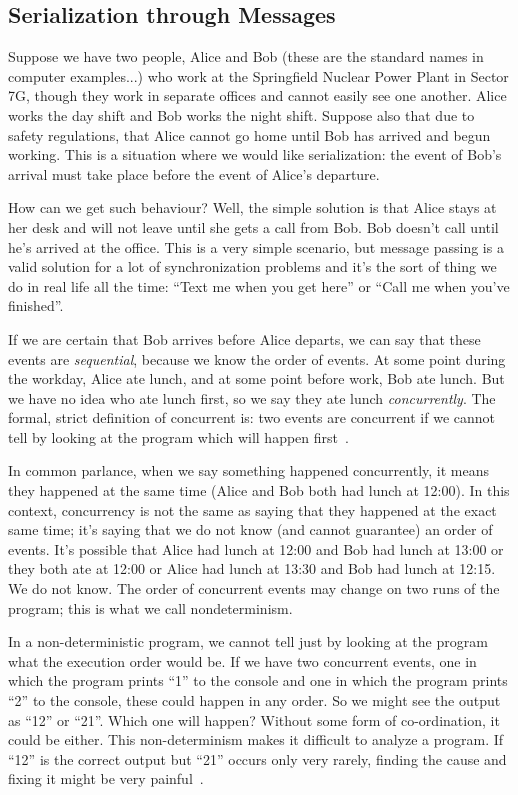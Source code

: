 \subsection*{Serialization through Messages}

Suppose we have two people, Alice and Bob (these are the standard names in computer examples...) who work at the Springfield Nuclear Power Plant in Sector 7G, though they work in separate offices and cannot easily see one another. Alice works the day shift and Bob works the night shift. Suppose also that due to safety regulations, that Alice cannot go home until Bob has arrived and begun working. This is a situation where we would like serialization: the event of Bob's arrival must take place before the event of Alice's departure.

How can we get such behaviour? Well, the simple solution is that Alice stays at her desk and will not leave until she gets a call from Bob. Bob doesn't call until he's arrived at the office. This is a very simple scenario, but message passing is a valid solution for a lot of synchronization problems and it's the sort of thing we do in real life all the time: ``Text me when you get here'' or ``Call me when you've finished''.

If we are certain that Bob arrives before Alice departs, we can say that these events are \textit{sequential}, because we know the order of events. At some point during the workday, Alice ate lunch, and at some point before work, Bob ate lunch. But we have no idea who ate lunch first, so we say they ate lunch \textit{concurrently}. The formal, strict definition of concurrent is: two events are concurrent if we cannot tell by looking at the program which will happen first~\cite{lbs}.

In common parlance, when we say something happened concurrently, it means they happened at the same time (Alice and Bob both had lunch at 12:00). In this context, concurrency is not the same as saying that they happened at the exact same time; it's saying that we do not know (and cannot guarantee) an order of events. It's possible that Alice had lunch at 12:00 and Bob had lunch at 13:00 or they both ate at 12:00 or Alice had lunch at 13:30 and Bob had lunch at 12:15. We do not know. The order of concurrent events may change on two runs of the program; this is what we call nondeterminism.

In a non-deterministic program, we cannot tell just by looking at the program what the execution order would be. If we have two concurrent events, one in which the program prints ``1'' to the console and one in which the program prints ``2'' to the console, these could happen in any order. So we might see the output as ``12'' or ``21''. Which one will happen? Without some form of co-ordination, it could be either. This non-determinism makes it difficult to analyze a program. If ``12'' is the correct output but ``21'' occurs only very rarely, finding the cause and fixing it might be very painful~\cite{lbs}.

